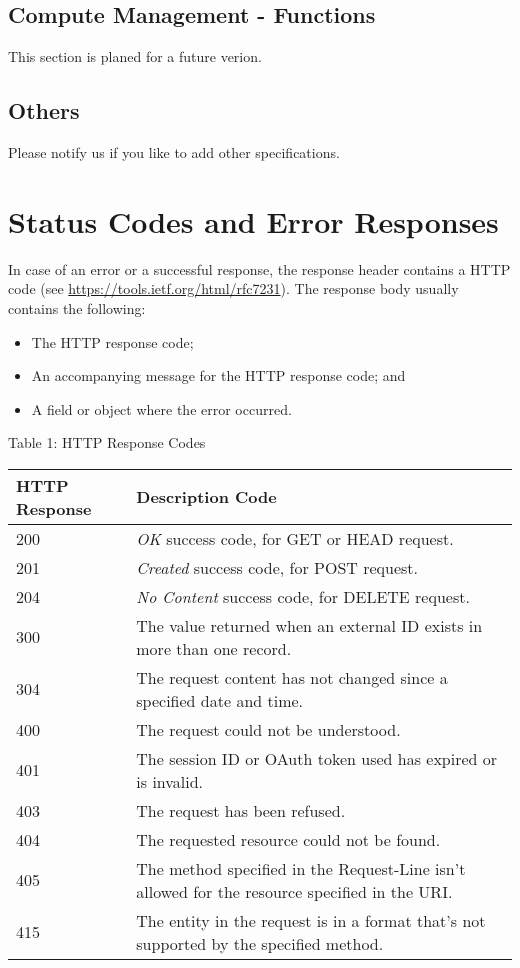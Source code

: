 \documentclass[9pt,]{article}
\begin{document}
\hypertarget{compute-management---functions}{%
\subsection{Compute Management -
Functions}\label{compute-management---functions}}

This section is planed for a future verion.

\hypertarget{others}{%
\subsection{Others}\label{others}}

Please notify us if you like to add other specifications.

\hypertarget{status-codes-and-error-responses}{%
\section{Status Codes and Error
Responses}\label{status-codes-and-error-responses}}

In case of an error or a successful response, the response header
contains a HTTP code (see \url{https://tools.ietf.org/html/rfc7231}).
The response body usually contains the following:

\begin{itemize}
\item
  The HTTP response code;
\item
  An accompanying message for the HTTP response code; and
\item
  A field or object where the error occurred.
\end{itemize}

Table 1: HTTP Response Codes

\begin{longtable}[]{@{}ll@{}}
\toprule
HTTP Response & Description Code\tabularnewline
\midrule
\endhead
200 & \emph{OK} success code, for GET or HEAD request.\tabularnewline
201 & \emph{Created} success code, for POST request.\tabularnewline
204 & \emph{No Content} success code, for DELETE request.\tabularnewline
300 & The value returned when an external ID exists in more than one
record.\tabularnewline
304 & The request content has not changed since a specified date and
time.\tabularnewline
400 & The request could not be understood.\tabularnewline
401 & The session ID or OAuth token used has expired or is
invalid.\tabularnewline
403 & The request has been refused.\tabularnewline
404 & The requested resource could not be found.\tabularnewline
405 & The method specified in the Request-Line isn't allowed for the
resource specified in the URI.\tabularnewline
415 & The entity in the request is in a format that's not supported by
the specified method.\tabularnewline
\bottomrule
\end{longtable}
\end{document}
